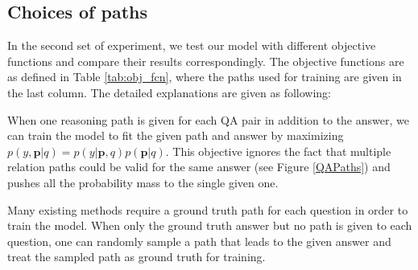 \begin{table}[h]\centering
{}
\caption{\fontsize{10}{12}\selectfont We break test set into two groups based on number of paths associated with them and report F1.}\label{tab:wqsp_cwq_path_break}
\end{table}

\subsection{Choices of paths} \label{sec:cop}
In the second set of experiment, we test our model with different objective functions and compare their results correspondingly. The objective functions are as defined in Table \ref{tab:obj_fcn}, where the paths used for training are given in the last column. The detailed explanations are given as following:

When one reasoning path is given for each QA pair in addition to the answer, we can train the model to fit the given path and answer by maximizing $p(y,\mathbf{p}|q)=p(y|\mathbf{p},q)p(\mathbf{p}|q)$. This objective ignores the fact that multiple relation paths could be valid for the same answer (see Figure \ref{QAPaths}) and pushes all the probability mass to the single given one.

Many existing methods require a ground truth path for each question in order to train the model.
When only the ground truth answer but no path is given to each question, one can randomly sample a path that leads to the given answer and treat the sampled path as ground truth for training.

